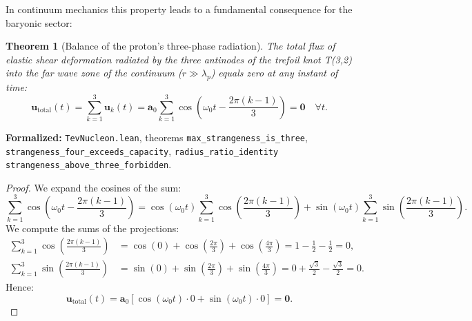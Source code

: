 \documentclass[11pt,a4paper]{article}
\newtheorem{theorem}{Theorem}
\theoremstyle{definition}
\theoremstyle{remark}
\begin{document}
In continuum mechanics this property leads to a fundamental consequence for the baryonic sector:

\begin{theorem}[Balance of the proton's three-phase radiation]
	\label{thm:three_phase_cancellation}
	The total flux of elastic shear deformation radiated by the three antinodes of the trefoil knot T(3,2) into the far wave zone of the continuum ($r \gg \lambda_p$) equals zero at any instant of time:
	\begin{equation}
		\mathbf{u}_{\mathrm{total}}(t) = \sum_{k=1}^3 \mathbf{u}_k(t) = \mathbf{a}_0 \sum_{k=1}^3 \cos\left(\omega_0 t - \frac{2\pi(k-1)}{3}\right) = \mathbf{0} \quad \forall t.
		\label{eq:three_phase_sum_zero}
	\end{equation}
\end{theorem}

\noindent\small\textbf{Formalized:} \texttt{TevNucleon.lean}, theorems \texttt{max_strangeness_is_three}, \texttt{strangeness_four_exceeds_capacity}, \texttt{radius_ratio_identity} \texttt{strangeness\_above\_three\_forbidden}.



\begin{proof}
	We expand the cosines of the sum:
	\begin{equation}
		\sum_{k=1}^3 \cos\left(\omega_0 t - \frac{2\pi(k-1)}{3}\right) = \cos(\omega_0 t) \sum_{k=1}^3 \cos\left(\frac{2\pi(k-1)}{3}\right) + \sin(\omega_0 t) \sum_{k=1}^3 \sin\left(\frac{2\pi(k-1)}{3}\right).
	\end{equation}
	We compute the sums of the projections:
	\begin{align}
		\sum_{k=1}^3 \cos\left(\frac{2\pi(k-1)}{3}\right) &= \cos(0) + \cos\left(\frac{2\pi}{3}\right) + \cos\left(\frac{4\pi}{3}\right) = 1 - \frac{1}{2} - \frac{1}{2} = 0, \\
		\sum_{k=1}^3 \sin\left(\frac{2\pi(k-1)}{3}\right) &= \sin(0) + \sin\left(\frac{2\pi}{3}\right) + \sin\left(\frac{4\pi}{3}\right) = 0 + \frac{\sqrt{3}}{2} - \frac{\sqrt{3}}{2} = 0.
	\end{align}
	Hence:
	\begin{equation}
		\mathbf{u}_{\mathrm{total}}(t) = \mathbf{a}_0 \left[ \cos(\omega_0 t) \cdot 0 + \sin(\omega_0 t) \cdot 0 \right] = \mathbf{0}.
	\end{equation}
\end{proof}
\end{document}
